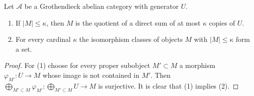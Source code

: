 \begin{lemma}
\label{lemma-set-iso-classes-bounded-size}
Let $\mathcal{A}$ be a Grothendieck abelian category with generator $U$.
\begin{enumerate}
\item If $|M| \leq \kappa$, then $M$ is the quotient of a direct
sum of at most $\kappa$ copies of $U$.
\item For every cardinal $\kappa$ the isomorphism classes
of objects $M$ with $|M| \leq \kappa$ form a set.
\end{enumerate}
\end{lemma}

\begin{proof}
For (1) choose for every proper subobject $M' \subset M$ a morphism
$\varphi_{M'} : U \to M$ whose image is not contained in $M'$. Then
$\bigoplus_{M' \subset M} \varphi_{M'} : \bigoplus_{M' \subset M} U \to M$
is surjective. It is clear that (1) implies (2).
\end{proof}
